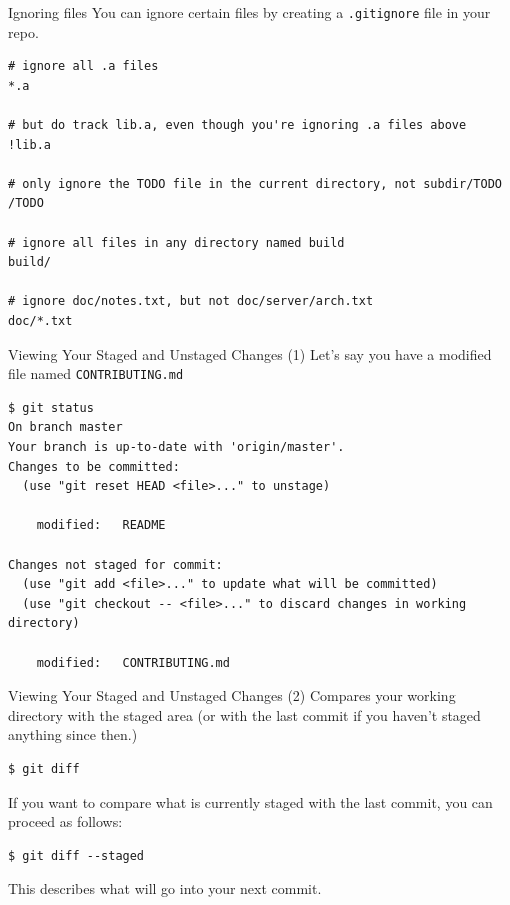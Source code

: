 \documentclass[handout]{beamer}
\begin{document}
\begin{frame}[fragile]{Ignoring files}
You can ignore certain files by creating a \texttt{.gitignore} file in your repo. 
\begin{lstlisting}
# ignore all .a files
*.a

# but do track lib.a, even though you're ignoring .a files above
!lib.a

# only ignore the TODO file in the current directory, not subdir/TODO
/TODO

# ignore all files in any directory named build
build/

# ignore doc/notes.txt, but not doc/server/arch.txt
doc/*.txt
\end{lstlisting}
\end{frame}

\begin{frame}[fragile]{Viewing Your Staged and Unstaged Changes (1)}
Let's say you have a modified file named \texttt{CONTRIBUTING.md}
\begin{lstlisting}
$ git status
On branch master
Your branch is up-to-date with 'origin/master'.
Changes to be committed:
  (use "git reset HEAD <file>..." to unstage)

    modified:   README

Changes not staged for commit:
  (use "git add <file>..." to update what will be committed)
  (use "git checkout -- <file>..." to discard changes in working directory)

    modified:   CONTRIBUTING.md
\end{lstlisting}
\end{frame}

\begin{frame}[fragile]{Viewing Your Staged and Unstaged Changes (2)}
Compares your working directory with the staged area (or with the last commit if you haven't staged anything since then.)
\begin{lstlisting}
$ git diff
\end{lstlisting}
If you want to compare what is currently staged with the last commit, you can proceed as follows:
\begin{lstlisting}
$ git diff --staged
\end{lstlisting}
This describes what will go into your next commit. 
\end{frame}
\end{document}
